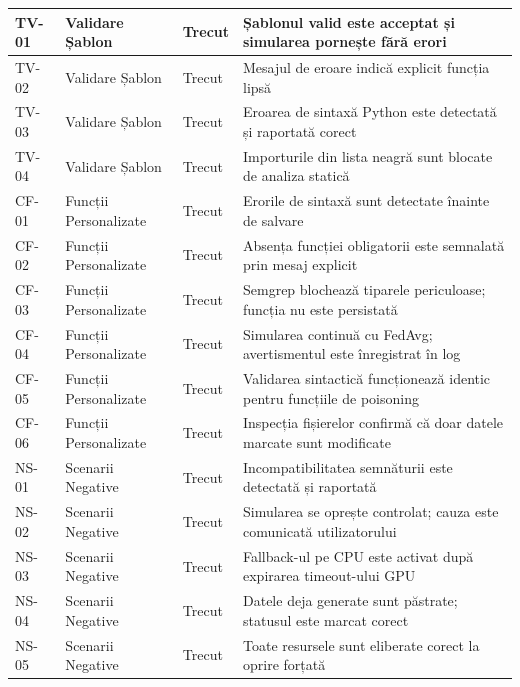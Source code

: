 \documentclass[../../main.tex]{subfiles}
\begin{document}
\begin{longtable}{|p{}|p{}|p{}|p{}|}
        \hline
        \endlastfoot
            TV-01 & Validare Șablon & Trecut & Șablonul valid este acceptat și simularea pornește fără erori \\
            \hline
            TV-02 & Validare Șablon & Trecut & Mesajul de eroare indică explicit funcția lipsă \\
            \hline
            TV-03 & Validare Șablon & Trecut & Eroarea de sintaxă Python este detectată și raportată corect \\
            \hline
            TV-04 & Validare Șablon & Trecut & Importurile din lista neagră sunt blocate de analiza statică \\
            \hline
            CF-01 & Funcții Personalizate & Trecut & Erorile de sintaxă sunt detectate înainte de salvare \\
            \hline
            CF-02 & Funcții Personalizate & Trecut & Absența funcției obligatorii este semnalată prin mesaj explicit \\
            \hline
            CF-03 & Funcții Personalizate & Trecut & Semgrep blochează tiparele periculoase; funcția nu este persistată \\
            \hline
            CF-04 & Funcții Personalizate & Trecut & Simularea continuă cu FedAvg; avertismentul este înregistrat în log \\
            \hline
            CF-05 & Funcții Personalizate & Trecut & Validarea sintactică funcționează identic pentru funcțiile de poisoning \\
            \hline
            CF-06 & Funcții Personalizate & Trecut & Inspecția fișierelor confirmă că doar datele marcate sunt modificate \\
            \hline
            NS-01 & Scenarii Negative & Trecut & Incompatibilitatea semnăturii este detectată și raportată \\
            \hline
            NS-02 & Scenarii Negative & Trecut & Simularea se oprește controlat; cauza este comunicată utilizatorului \\
            \hline
            NS-03 & Scenarii Negative & Trecut & Fallback-ul pe CPU este activat după expirarea timeout-ului GPU \\
            \hline
            NS-04 & Scenarii Negative & Trecut & Datele deja generate sunt păstrate; statusul este marcat corect \\
            \hline
            NS-05 & Scenarii Negative & Trecut & Toate resursele sunt eliberate corect la oprire forțată \\

\end{longtable}
\end{document}

